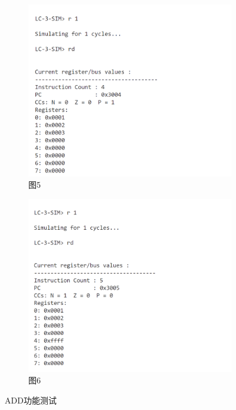 \documentclass[UTF8]{ctexart}
\begin{document}
\begin{figure}[htbp]
  \vspace{0.5cm}

  \begin{subfigure}{0.45\textwidth}
    \includegraphics[width=\linewidth]{add5.png}
    \caption{图5}
  \end{subfigure}
  \hfill
  \begin{subfigure}{0.45\textwidth}
    \includegraphics[width=\linewidth]{add6.png}
    \caption{图6}
  \end{subfigure}

  \caption{ADD功能测试}
  \label{ADD}
\end{figure}
\end{document}
